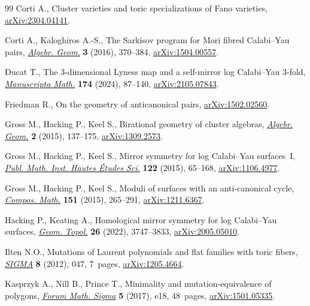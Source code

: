 \documentclass[pdftex]{sigma}
\numberwithin{equation}{section}
\begin{document}
\begin{thebibliography}{99}
Corti A., Cluster varieties and toric specializations of {F}ano varieties,
 \href{https://arxiv.org/abs/2304.04141}{arXiv:2304.04141}.

Corti A., Kaloghiros A.-S., The {S}arkisov program for {M}ori fibred
 {C}alabi--{Y}au pairs, \href{https://doi.org/10.14231/AG-2016-016}{\textit{Algebr. Geom.}} \textbf{3} (2016), 370--384,
 \href{https://arxiv.org/abs/1504.00557}{arXiv:1504.00557}.

Ducat T., The 3-dimensional {L}yness map and a self-mirror log {C}alabi--{Y}au
 3-fold, \href{https://doi.org/10.1007/s00229-023-01497-0}{\textit{Manuscripta Math.}} \textbf{174} (2024), 87--140,
 \href{https://arxiv.org/abs/2105.07843}{arXiv:2105.07843}.

Friedman R., On the geometry of anticanonical pairs, \href{https://arxiv.org/abs/1502.02560}{arXiv:1502.02560}.

Gross M., Hacking P., Keel S., Birational geometry of cluster algebras,
 \href{https://doi.org/10.14231/AG-2015-007}{\textit{Algebr. Geom.}} \textbf{2} (2015), 137--175, \href{https://arxiv.org/abs/1309.2573}{arXiv:1309.2573}.

Gross M., Hacking P., Keel S., Mirror symmetry for log {C}alabi--{Y}au
 surfaces~{I}, \href{https://doi.org/10.1007/s10240-015-0073-1}{\textit{Publ. Math. Inst. Hautes \'{E}tudes Sci.}} \textbf{122}
 (2015), 65--168, \href{https://arxiv.org/abs/1106.4977}{arXiv:1106.4977}.

Gross M., Hacking P., Keel S., Moduli of surfaces with an anti-canonical cycle,
 \href{https://doi.org/10.1112/S0010437X14007611}{\textit{Compos. Math.}} \textbf{151} (2015), 265--291, \href{https://arxiv.org/abs/1211.6367}{arXiv:1211.6367}.

Hacking P., Keating A., Homological mirror symmetry for log {C}alabi--{Y}au
 surfaces, \href{https://doi.org/10.2140/gt.2022.26.3747}{\textit{Geom. Topol.}} \textbf{26} (2022), 3747--3833,
 \href{https://arxiv.org/abs/2005.05010}{arXiv:2005.05010}.

Ilten N.O., Mutations of {L}aurent polynomials and flat families with toric
 fibers, \href{https://doi.org/10.3842/SIGMA.2012.047}{\textit{SIGMA}} \textbf{8} (2012), 047, 7~pages, \href{https://arxiv.org/abs/1205.4664}{arXiv:1205.4664}.

Kasprzyk A., Nill B., Prince T., Minimality and mutation-equivalence of
 polygons, \href{https://doi.org/10.1017/fms.2017.10}{\textit{Forum Math. Sigma}} \textbf{5} (2017), e18, 48~pages,
 \href{https://arxiv.org/abs/1501.05335}{arXiv:1501.05335}.


\end{thebibliography}
\end{document}
